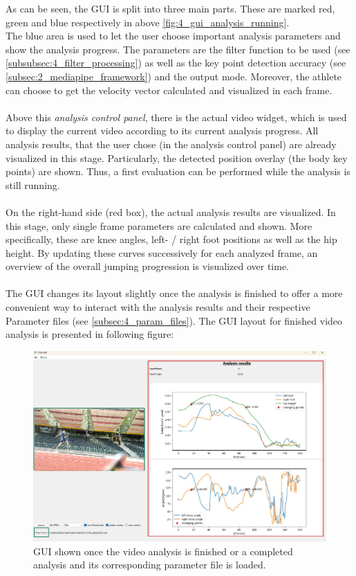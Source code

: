 \FloatBarrier
\noindent As can be seen, the \ac{GUI} is split into three main parts.
These are marked red, green and blue respectively in above
\autoref{fig:4_gui_analysis_running}.\\
The blue area is used to let the user choose important analysis parameters and
show the analysis progress.
The parameters are the filter function to be used (see
\autoref{subsubsec:4_filter_processing}) as well as the key point detection
accuracy (see \autoref{subsec:2_mediapipe_framework}) and the output mode.
Moreover, the athlete can choose to get the velocity vector calculated and
visualized in each frame.\\\\
\noindent Above this \textit{analysis control panel}, there is the actual
video widget, which is used to display the current video according to its
current analysis progress. All analysis results, that the user chose (in the
analysis control panel) are already visualized in this stage.
Particularly, the detected position overlay (the body key points) are shown.  
Thus, a first evaluation can be performed while the analysis is still running.\\\\
\noindent On the right-hand side (red box), the actual analysis results are
visualized. In this stage, only single frame parameters are calculated and
shown. More specifically, these are knee angles, left- / right foot positions
as well as the hip height.
By updating these curves successively for each analyzed frame, an overview of 
the overall jumping progression is visualized over time.\\\\
\noindent The \ac{GUI} changes its layout slightly once the analysis is
finished to offer a more convenient way to interact with the analysis results
and their respective Parameter files (see \autoref{subsec:4_param_files}).
The \ac{GUI} layout for finished video analysis is presented in following
figure: 
\begin{figure}[h!]
    \centering
    \includegraphics[scale=0.7]{GUI_finished_analysis.pdf}
    \caption[Analysis results \acs*{GUI}]{\acs*{GUI} shown once the video
    analysis is finished or a completed analysis and its corresponding
    parameter file is loaded.}
    \label{fig:4_gui_analysis_finished}
\end{figure}
